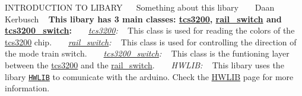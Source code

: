 I\+N\+T\+R\+O\+D\+U\+C\+T\+I\+ON TO L\+I\+B\+A\+RY~\newline
~\newline
Something about this libary ~\newline
~\newline
Daan Kerbusch ~\newline
{\bfseries This libary has 3 main classes\+: \hyperlink{classtcs3200}{tcs3200}, \hyperlink{classrail__switch}{rail\+\_\+switch} and \hyperlink{classtcs3200__switch}{tcs3200\+\_\+switch}\+:} ~\newline
~\newline
{\itshape \hyperlink{classtcs3200}{tcs3200}\+:} ~\newline
This class is used for reading the colors of the \hyperlink{classtcs3200}{tcs3200} chip. ~\newline
~\newline
{\itshape \hyperlink{classrail__switch}{rail\+\_\+switch}\+:} ~\newline
This class is used for controlling the direction of the mode train switch. ~\newline
~\newline
{\itshape \hyperlink{classtcs3200__switch}{tcs3200\+\_\+switch}\+:} ~\newline
This class is the funtioning layer between the \hyperlink{classtcs3200}{tcs3200} and the \hyperlink{classrail__switch}{rail\+\_\+switch}. ~\newline
~\newline
{\itshape H\+W\+L\+IB\+:} ~\newline
This libary uses the libary \href{https://github.com/wovo/hwlib}{\tt H\+W\+L\+IB} to comunicate with the arduino. Check the \hyperlink{HWLIB}{H\+W\+L\+IB} page for more information. 